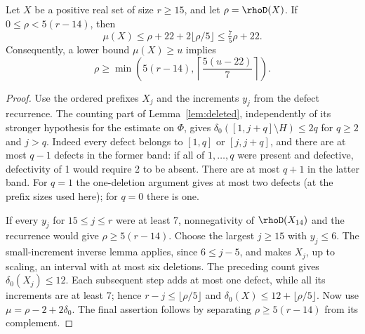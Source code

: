 \begin{lemma}\label{lem:six-flexible98}
Let $X$ be a positive real set of size $r\geq15$, and let
$\rho=\rhoD(X)$. If $0\leq\rho<5(r-14)$, then
\[
 \mu(X)\leq\rho+22+2\lfloor\rho/5\rfloor
 \leq\tfrac75\rho+22.
\]
Consequently, a lower bound $\mu(X)\geq u$ implies
\[
 \rho\geq\min\left(5(r-14),
              \left\lceil\frac{5(u-22)}7\right\rceil\right).
\]
\end{lemma}
\begin{proof}
Use the ordered prefixes $X_j$ and the increments $y_j$ from the defect
recurrence. The counting part of Lemma~\ref{lem:deleted}, independently of
its stronger hypothesis for the estimate on $\Phi$, gives
$\delta_0([1,j+q]\setminus H)\leq2q$ for $q\geq2$ and $j>q$.
Indeed every defect belongs to $[1,q]$ or $[j,j+q]$, and there are at most
$q-1$ defects in the former band: if all of $1,\ldots,q$ were present
and defective, defectivity of 1 would require 2 to be absent.
There are at most $q+1$ in the latter band. For $q=1$ the one-deletion
argument gives at most two defects (at the prefix sizes used here);
for $q=0$ there is one.

If every $y_j$ for $15\leq j\leq r$ were at least 7, nonnegativity of
$\rhoD(X_{14})$ and the recurrence would give
$\rho\geq5(r-14)$. Choose the largest $j\geq15$ with $y_j\leq6$.
The small-increment inverse lemma applies, since $6\leq j-5$, and makes
$X_j$, up to scaling, an interval with at most six deletions.
The preceding count gives $\delta_0(X_j)\leq12$.
Each subsequent step adds at most one defect, while all its increments
are at least 7; hence $r-j\leq\lfloor\rho/5\rfloor$ and
$\delta_0(X)\leq12+\lfloor\rho/5\rfloor$.
Now use $\mu=\rho-2+2\delta_0$. The final assertion follows by separating
$\rho\geq5(r-14)$ from its complement.
\end{proof}


